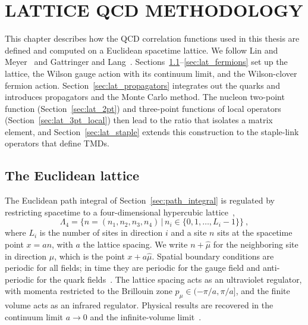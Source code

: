 \section{LATTICE QCD METHODOLOGY}
\label{sec:lattice_methodology}


This chapter describes how the QCD correlation functions used in this thesis are defined and computed on a Euclidean spacetime lattice. We follow Lin and Meyer~\cite{Lin:2014} and Gattringer and Lang~\cite{Gattringer:2010zz}.
Sections~\ref{sec:lat_lattice}--\ref{sec:lat_fermions} set up the lattice, the Wilson gauge action with its continuum limit, and the Wilson-clover fermion action. Section~\ref{sec:lat_propagators} integrates out the quarks and introduces propagators and the Monte Carlo method. The nucleon two-point function (Section~\ref{sec:lat_2pt}) and three-point functions of local operators (Section~\ref{sec:lat_3pt_local}) then lead to the ratio that isolates a matrix element, and Section~\ref{sec:lat_staple} extends this construction to the staple-link operators that define TMDs.

\subsection{The Euclidean lattice}
\label{sec:lat_lattice}

The Euclidean path integral of Section~\ref{sec:path_integral} is regulated by restricting spacetime to a four-dimensional hypercubic lattice~\cite{Wilson:1974sk},
\begin{equation}
    \Lambda_4=\{n=(n_1,n_2,n_3,n_4)\,|\,n_i\in\{0,1,\ldots,L_i-1\}\} \ ,
    \label{eq:lattice_def}
\end{equation}
where $L_i$ is the number of sites in direction $i$ and a site $n$ sits at the spacetime point $x=an$, with $a$ the lattice spacing. We write $n+\hat\mu$ for the neighboring site in direction $\mu$, which is the point $x+a\hat\mu$. Spatial boundary conditions are periodic for all fields; in time they are periodic for the gauge field and anti-periodic for the quark fields~\cite{Gattringer:2010zz}. The lattice spacing acts as an ultraviolet regulator, with momenta restricted to the Brillouin zone $p_\mu\in(-\pi/a,\pi/a]$, and the finite volume acts as an infrared regulator. Physical results are recovered in the continuum limit $a\to0$ and the infinite-volume limit~\cite{Gattringer:2010zz}.

